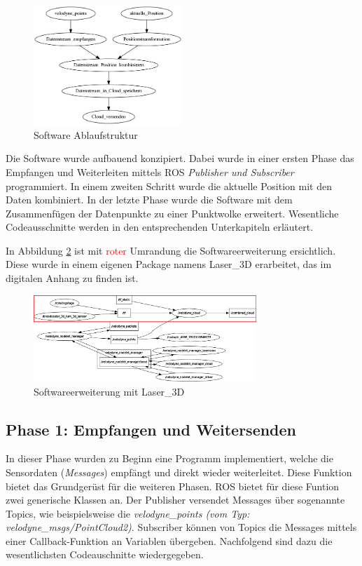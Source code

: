\begin{figure}[H]
	\centering
	\includegraphics[width=0.5\textwidth]{resources/software_flow.png}
	\caption{Software Ablaufstruktur}
	\label{fig:software_flow}
\end{figure}  

Die Software wurde aufbauend konzipiert. Dabei wurde in einer ersten Phase das Empfangen und Weiterleiten mittels ROS \textit{Publisher und Subscriber} programmiert. In einem zweiten Schritt wurde die aktuelle Position mit den Daten kombiniert. In der letzte Phase wurde die Software mit dem Zusammenfügen der Datenpunkte zu einer Punktwolke erweitert. Wesentliche Codeausschnitte werden in den entsprechenden Unterkapiteln erläutert.

In Abbildung \ref{fig:rqt_graph_erweitert_2} ist mit \textcolor{red}{roter} Umrandung die Softwareerweiterung ersichtlich. Diese wurde in einem eigenen Package namens Laser\_3D erarbeitet, das im digitalen Anhang zu finden ist. 

\begin{figure}[H]
	\centering
	\includegraphics[width=0.75\textwidth]{resources/rqt_graph_erweitert_2.png}
	\caption{Softwareerweiterung mit Laser\_3D}
	\label{fig:rqt_graph_erweitert_2}
\end{figure} 
\subsection{Phase 1: Empfangen und Weitersenden}
\label{subsec:Phase2}
In dieser Phase wurden zu Beginn eine Programm implementiert, welche die Sensordaten (\textit{Messages}) empfängt und direkt wieder weiterleitet. Diese Funktion bietet das Grundgerüst für die weiteren Phasen. ROS bietet für diese Funtion zwei generische Klassen an. Der Publisher versendet Messages über sogenannte Topics, wie beispielsweise die \textit{velodyne\_points (vom Typ: velodyne\_msgs/PointCloud2)}. Subscriber können von Topics die Messages mittels einer Callback-Funktion an Variablen übergeben. Nachfolgend sind dazu die wesentlichsten Codeauschnitte wiedergegeben. \cite{pubsub} 

